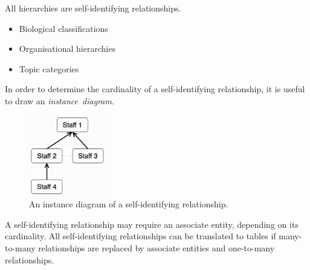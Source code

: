 All hierarchies are self-identifying relationships.
\begin{itemize}
  \item Biological classifications
  \item Organisational hierarchies
  \item Topic categories
\end{itemize}

In order to determine the cardinality of a self-identifying relationship, it is useful to draw an \emph{instance~diagram}.

\begin{figure}[htp]
  \centering
  \includegraphics[width=0.3\textwidth]{unit-1/figures/instance-diagram.jpg}
  \caption*{An instance diagram of a self-identifying relationship.}
\end{figure}

A self-identifying relationship may require an associate entity, depending on its cardinality.
All self-identifying relationships can be translated to tables if many-to-many relationships are replaced by associate entities and one-to-many relationships.
